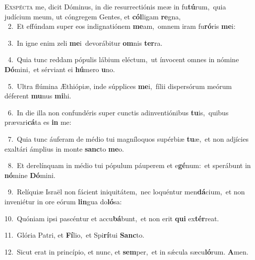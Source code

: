 \lettrine{\initial\textcolor{\initialcolor}{E}}{xspécta} me, dicit Dóminus, in die resurrectiónis meæ in fu\-\textbf{tú}\-rum,~\star quia judícium meum, ut cóngregem Gentes, et \textbf{cól}\-ligam \textbf{re}\-gna,\\
{\numbfont\textcolor{\numbcolor}{~2.}}~Et effúndam super eos indignatiónem \textbf{me}\-am,~\star omnem iram fu\-\textbf{ró}\-ris \textbf{me}\-i:\par
{\numbfont\textcolor{\numbcolor}{~3.}}~In igne enim zeli \textbf{me}\-i~\star devorábitur \textbf{om}\-nis \textbf{ter}\-ra.\par
{\numbfont\textcolor{\numbcolor}{~4.}}~Quia tunc reddam pópulis lábium eléctum,~\dagger ut ínvocent omnes in nómine \textbf{Dó}\-mini,~\star et sérviant ei \textbf{hú}\-mero \textbf{u}\-no.\par
{\numbfont\textcolor{\numbcolor}{~5.}}~Ultra flúmina Æthiópiæ, inde súpplices \textbf{me}\-i,~\star fílii dispersórum meórum déferent \textbf{mu}\-nus \textbf{mi}\-hi.\par
{\numbfont\textcolor{\numbcolor}{~6.}}~In die illa non confundéris super cunctis adinventiónibus \textbf{tu}\-is,~\star quibus prævari\-\textbf{cá}\-ta es \textbf{in} me:\par
{\numbfont\textcolor{\numbcolor}{~7.}}~Quia tunc áuferam de médio tui magníloquos supérbiæ \textbf{tu}\-æ,~\star et non adjícies exaltári ámplius in monte \textbf{sanc}\-to \textbf{me}\-o.\par
{\numbfont\textcolor{\numbcolor}{~8.}}~Et derelínquam in médio tui pópulum páuperem et e\-\textbf{gé}\-num:~\star et sperábunt in \textbf{nó}\-mine \textbf{Dó}\-mini.\par
{\numbfont\textcolor{\numbcolor}{~9.}}~Relíquiæ Israël non fácient iniquitátem,~\dagger nec loquéntur men\-\textbf{dá}\-cium,~\star et non inveniétur in ore eórum \textbf{lin}\-gua do\-\textbf{ló}\-sa:\par
{\numbfont\textcolor{\numbcolor}{10.}}~Quóniam ipsi pascéntur et accu\-\textbf{bá}\-bunt,~\star et non erit \textbf{qui} ex\-\textbf{tér}\-reat.\par
{\numbfont\textcolor{\numbcolor}{11.}}~Glória Patri, et \textbf{Fí}\-lio,~\star et Spi\-\textbf{rí}\-tui \textbf{Sanc}\-to.\par
{\numbfont\textcolor{\numbcolor}{12.}}~Sicut erat in princípio, et nunc, et \textbf{sem}\-per,~\star et in sǽcula sæcu\-\textbf{ló}\-rum. \textbf{A}\-men.\par
